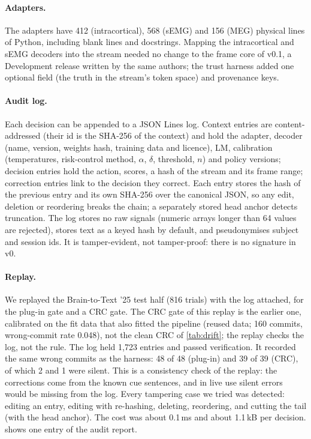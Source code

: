 \paragraph{Adapters.} The adapters have 412 (intracortical), 568 (sEMG) and 156 (MEG) physical lines of Python, including blank lines and docstrings. Mapping the intracortical and sEMG decoders into the stream needed no change to the frame core of v0.1, a Development release written by the same authors; the trust harness added one optional field (the truth in the stream's token space) and provenance keys.

\paragraph{Audit log.} Each decision can be appended to a JSON Lines log. Context entries are content-addressed (their id is the SHA-256 of the context) and hold the adapter, decoder (name, version, weights hash, training data and licence), LM, calibration (temperatures, risk-control method, $\alpha$, $\delta$, threshold, $n$) and policy versions; decision entries hold the action, scores, a hash of the stream and its frame range; correction entries link to the decision they correct. Each entry stores the hash of the previous entry and its own SHA-256 over the canonical JSON, so any edit, deletion or reordering breaks the chain; a separately stored head anchor detects truncation. The log stores no raw signals (numeric arrays longer than 64 values are rejected), stores text as a keyed hash by default, and pseudonymises subject and session ids. It is tamper-evident, not tamper-proof: there is no signature in v0.

\paragraph{Replay.} We replayed the Brain-to-Text '25 test half (816 trials) with the log attached, for the plug-in gate and a CRC gate. The CRC gate of this replay is the earlier one, calibrated on the fit data that also fitted the pipeline (reused data; 160 commits, wrong-commit rate 0.048), not the clean CRC of \cref{tab:drift}; the replay checks the log, not the rule. The log held 1,723 entries and passed verification. It recorded the same wrong commits as the harness: 48 of 48 (plug-in) and 39 of 39 (CRC), of which 2 and 1 were silent. This is a consistency check of the replay: the corrections come from the known cue sentences, and in live use silent errors would be missing from the log. Every tampering case we tried was detected: editing an entry, editing with re-hashing, deleting, reordering, and cutting the tail (with the head anchor). The cost was about 0.1\,ms and about 1.1\,kB per decision.  shows one entry of the audit report.

